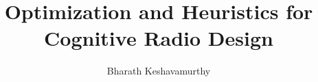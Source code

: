 \documentclass[ece,dissertation]{puthesis}
\title{Optimization and Heuristics for Cognitive Radio Design}
\author{Bharath Keshavamurthy}{Keshavamurthy, Bharath}
\begin{document}
\volume














\end{document}
